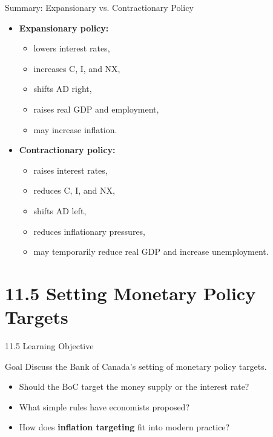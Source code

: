 \documentclass[aspectratio=169]{beamer}
\begin{document}
\begin{frame}{Summary: Expansionary vs. Contractionary Policy}
\transfade
\begin{itemize}[<+->]
  \item \textbf{Expansionary policy:}
  \begin{itemize}[<+->]
    \item lowers interest rates,
    \item increases C, I, and NX,
    \item shifts AD right,
    \item raises real GDP and employment,
    \item may increase inflation.
  \end{itemize}
  \item \textbf{Contractionary policy:}
  \begin{itemize}[<+->]
    \item raises interest rates,
    \item reduces C, I, and NX,
    \item shifts AD left,
    \item reduces inflationary pressures,
    \item may temporarily reduce real GDP and increase unemployment.
  \end{itemize}
\end{itemize}
\end{frame}

\section{11.5 Setting Monetary Policy Targets}

\begin{frame}{11.5 Learning Objective}
\transfade
\begin{block}{Goal}
Discuss the Bank of Canada’s setting of monetary policy targets.
\end{block}
\begin{itemize}[<+->]
  \item Should the BoC target the money supply or the interest rate?
  \item What simple rules have economists proposed?
  \item How does \textbf{inflation targeting} fit into modern practice?
\end{itemize}
\end{frame}
\end{document}
